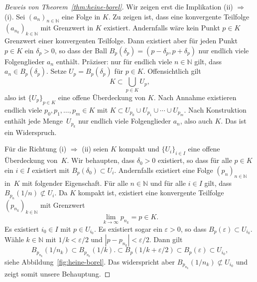 \documentclass[../main.tex]{subfiles}
\begin{document}
\begin{proof}[Beweis von Theorem~\ref{thm:heine-borel}]
  Wir zeigen erst die Implikation
  (ii) $\Rightarrow$ (i). Sei
  ${(a_{n})}_{n \in \mathbb{N}}$ eine
  Folge in $K$. Zu zeigen ist, dass
  eine konvergente Teilfolge
  ${(a_{n_{k}})}_{k \in \mathbb{N}}$ 
  mit Grenzwert in $K$ existiert.
  Andernfalls wäre kein Punkt $p \in K$ 
  Grenzwert einer konvergenten Teilfolge.
  Dann existiert aber für jeden Punkt $p \in K$ 
  ein $\delta_p > 0$, so
  dass der Ball $B_p(\delta_p) = (p - \delta_p, p + \delta_p)$ 
  nur endlich viele Folgenglieder $a_n$ enthält.
  Präziser: nur für endlich viele $n \in \mathbb{N}$
  gilt, dass $a_n \in B_p(\delta_p)$.
  Setze  $U_p = B_{p}(\delta_p)$ für $p \in K$.
  Offensichtlich gilt
  \[
    K \subset \bigcup_{p \in K} U_p,
  \]
  also ist ${\{U_p\}}_{p \in K}$ eine offene Überdeckung
  von $K$. Nach Annahme existieren
  endlich viele $p_0, p_1, \dots, p_m \in K$ 
  mit $K \subset U_{p_0} \cup U_{p_1}
  \cup \cdots \cup U_{p_m}$.
  Nach Konstruktion enthält jede Menge~$U_{p_k}$ 
  nur endlich viele Folgenglieder
  $a_n$, also auch $K$. Das ist ein Widerspruch.
  
  Für die Richtung (i) $\Rightarrow$ (ii) seien
  $K$ kompakt und ${\{U_i\}}_{i \in I}$ eine
  offene Überdeckung von~$K$.
  Wir behaupten, dass
  $\delta_0 > 0$ existiert, so dass
  für alle $p \in K$ ein $i \in I$ existiert
  mit $B_p(\delta_0) \subset U_i$.
  Andernfalls existiert eine Folge
  ${(p_{n})}_{n \in \mathbb{N}}$ in~$K$ 
  mit folgender Eigenschaft.
  Für alle $n \in \mathbb{N}$ 
  und für alle $i \in I$ 
  gilt, dass
  $B_{p_n}(1/n) \not \subset U_i$.
  Da $K$ kompakt ist,
  existiert eine konvergente Teilfolge
  ${(p_{n_k})}_{k \in \mathbb{N}}$
   mit Grenzwert
  \[
    \lim_{k \to \infty} p_{n_k} = p \in K.
  \]
  Es existiert $i_0 \in I$ 
  mit $p \in U_{i_0}$.
  Es existiert sogar ein
  $\varepsilon > 0$, so dass
  $B_p(\varepsilon) \subset U_{i_0}$.
  Wähle $k \in \mathbb{N}$ mit
  $1/k < \varepsilon/2$
  und $|p - p_{n_k}| < \varepsilon/2$.
  Dann gilt
  \[
    B_{p_{n_k}}(1/n_k) \subset B_{p_{n_k}}(1/k).
    \subset B_p(1/k + \varepsilon / 2)
    \subset B_p(\varepsilon) \subset U_{i_0},
  \]
  siehe Abbildung~\ref{fig:heine-borel}.
  Das widerspricht aber
  $B_{p_{n_k}}(1/n_k) \not\subset U_{i_0}$
  und zeigt somit unsere Behauptung.


\end{proof}
\end{document}
